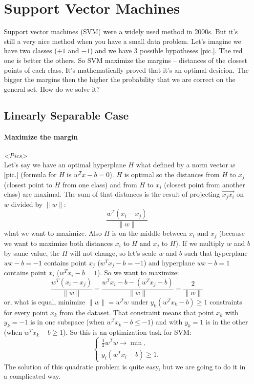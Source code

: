 \chapter{Support Vector Machines}

{\sf Support vector machines (SVM) were a widely used method in 2000s. But it's still a very nice method when you have a small data problem. Let's imagine we have two classes ($+1$ and $-1$) and we have 3 possible hypotheses [pic.]. The red one is better the others. So SVM maximize the margins -- distances of the closest points of each class. It's mathematically proved that it's an optimal desicion. The bigger the margins then the higher the probability that we are correct on the general set. How do we solve it?}

\section{Linearly Separable Case}
\vspace{-0.6cm}
\subsubsection*{Maximize the margin}

{\it <Pics>}\\
Let's say we have an optimal hyperplane $H$ what defined by a norm vector $w$ [pic.] (formula for $H$ is $w^Tx-b=0$). $H$ is optimal so the distances from $H$ to $x_j$ (closest point to $H$ from one class) and from $H$ to $x_i$ (closest point from another class) are maximal. The sum of that distances is the result of projecting $\overrightarrow{x_jx_i}$ on $w$ divided by $\|w\|$:
$$\frac{w^T(x_i-x_j)}{\|w\|}$$
what we want to maximize. Also $H$ is on the middle between $x_i$ and $x_j$ (because we want to maximize both distances $x_i$ to $H$ and $x_j$ to $H$). If we multiply $w$ and $b$ by same value, the $H$ will not change, so let's scale $w$ and $b$ such that hyperplane $wx-b=-1$ contains point $x_j$ ($w^Tx_j-b=-1$) and hyperplane $wx-b=1$ contains point $x_i$ ($w^Tx_i-b=1$). So we want to maximize:
$$\frac{w^T(x_i-x_j)}{\|w\|}=\frac{w^Tx_i-b-(w^Tx_j-b)}{\|w\|}=\frac{2}{\|w\|}$$
or, what is equal, minimize $\|w\|=w^Tw$ under $y_k(w^Tx_k-b)\ge 1$ constraints for every point $x_k$ from the dataset. That constraint means that point $x_k$ with $y_k=-1$ is in one subspace (when $w^Tx_k-b\le-1$) and with $y_k=1$ is in the other (when $w^Tx_k-b\ge1$). So this is an optimization task for SVM:
$$\begin{cases}
	\frac{1}{2}w^Tw\to\min, \\
	y_i(w^Tx_i-b)\ge1.
\end{cases}$$
The solution of this quadratic problem is quite easy, but we are going to do it in a complicated way.

